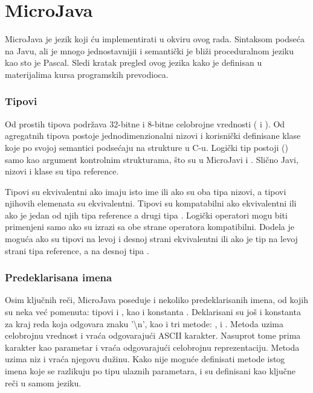 
\chapter{MicroJava}

MicroJava je jezik koji ću implementirati u okviru ovog rada. Sintaksom podseća na Javu, ali je mnogo jednostavnijii i semantički je bliži proceduralnom jeziku kao sto je Pascal. Sledi kratak pregled ovog jezika kako je definisan u materijalima kursa programskih prevodioca.

\subsection*{Tipovi}

Od prostih tipova podržava 32-bitne i 8-bitne celobrojne vrednosti ( i ). Od agregatnih tipova postoje jednodimenzionalni nizovi i korisnički definisane  klase koje po svojoj semantici podsećaju na strukture u C-u. Logički tip postoji () samo kao argument kontrolnim strukturama, što su u MicroJavi  i . Slično Javi, nizovi i klase su tipa reference.

Tipovi su ekvivalentni ako imaju isto ime ili ako su oba tipa nizovi, a tipovi njihovih elemenata su ekvivalentni. Tipovi su kompatabilni ako ekvivalentni ili ako je jedan od njih tipa reference a drugi tipa . Logički operatori mogu biti primenjeni samo ako su izrazi sa obe strane operatora kompatibilni. Dodela je moguća ako su tipovi na levoj i desnoj strani ekvivalentni ili ako je tip na levoj strani tipa reference, a na desnoj tipa .

\subsection*{Predeklarisana imena}

Osim ključnih reči, MicroJava poseduje i nekoliko predeklarisanih imena, od kojih su neka već pomenuta: tipovi  i , kao i konstanta . Deklarisani su još i konstanta za kraj reda  koja odgovara znaku '\textbackslash n', kao i tri metode: ,  i . Metoda   uzima celobrojnu vrednost i vraća odgovarajući ASCII karakter. Nasuprot tome  prima karakter kao parametar i vraća odgovarajući celobrojnu reprezentaciju. Metoda  uzima niz i vraća njegovu dužinu. Kako nije moguće definisati metode istog imena koje se razlikuju po tipu ulaznih parametara,  i  su definisani kao ključne reči u samom jeziku.

